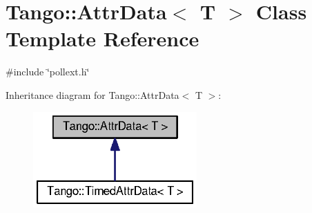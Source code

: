 \section{Tango\-:\-:Attr\-Data$<$ T $>$ Class Template Reference}
\label{classTango_1_1AttrData}


{\ttfamily \#include \char`\"{}pollext.\-h\char`\"{}}



Inheritance diagram for Tango\-:\-:Attr\-Data$<$ T $>$\-:
\nopagebreak
\begin{figure}[H]
\begin{center}
\leavevmode
\includegraphics[width=178pt]{d8/d3e/classTango_1_1AttrData__inherit__graph}
\end{center}
\end{figure}
